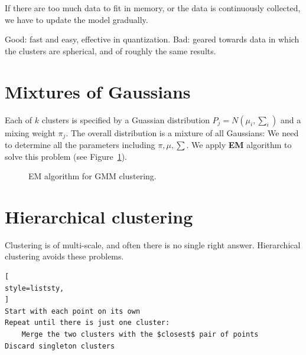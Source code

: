  If there are too much data to fit in memory, or the data
is continuously collected, we have to update the model gradually.

 Good: fast and easy, effective in quantization. Bad: geared towards data in which the clusters are spherical, and of roughly the same results.

\section{Mixtures of Gaussians} 
Each of $k$ clusters is specified by a Guassian distribution $P_j = N(\mu_i, \sum_i)$ and a mixing weight
$\pi_j$. The overall distribution is a mixture of all Gaussians:
We need to determine all the parameters including $\pi, \mu, \sum$. We apply \textbf{EM} algorithm to solve this problem
(see Figure~\ref{fig:em_mar}).
\begin{figure}[H]
    \caption{EM algorithm for GMM clustering.}
    \label{fig:em_mar}
\end{figure}

\section{Hierarchical clustering} 
Clustering is of multi-scale, and often there is no single right answer. Hierarchical 
clustering avoids these problems.
\begin{lstlisting}[
style=liststy,
]
Start with each point on its own
Repeat until there is just one cluster:
    Merge the two clusters with the $closest$ pair of points
Discard singleton clusters
\end{lstlisting}

